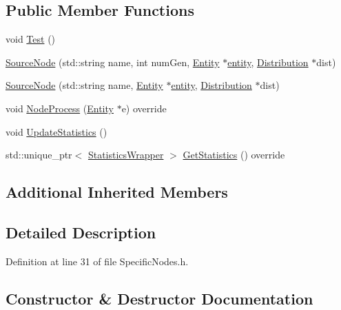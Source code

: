 \subsection*{Public Member Functions}
\begin{DoxyCompactItemize}
\item 
void \hyperlink{class_source_node_acb96be478aebf6c2badd1c5d1164e24c}{Test} ()
\item 
\hyperlink{class_source_node_aad28db9c905ffdccd8013bc1e4481848}{Source\+Node} (std\+::string name, int num\+Gen, \hyperlink{class_entity}{Entity} $\ast$\hyperlink{_entity_8h_ad79a57ed3105eb60d991a1aeb4a9dc44a428e8fcd53019fa239fa3419261e499e}{entity}, \hyperlink{class_distribution}{Distribution} $\ast$dist)
\item 
\hyperlink{class_source_node_ab287553b2a359c578f4579bd467806a2}{Source\+Node} (std\+::string name, \hyperlink{class_entity}{Entity} $\ast$\hyperlink{_entity_8h_ad79a57ed3105eb60d991a1aeb4a9dc44a428e8fcd53019fa239fa3419261e499e}{entity}, \hyperlink{class_distribution}{Distribution} $\ast$dist)
\item 
void \hyperlink{class_source_node_a666a65bd2424a8f56d8f08260c09c0b4}{Node\+Process} (\hyperlink{class_entity}{Entity} $\ast$e) override
\item 
void \hyperlink{class_source_node_a6c5037fd886362d56b7ce04094433510}{Update\+Statistics} ()
\item 
std\+::unique\+\_\+ptr$<$ \hyperlink{class_generic_node_1_1_statistics_wrapper}{Statistics\+Wrapper} $>$ \hyperlink{class_source_node_a0aea882fe808d9da6d506653be166e73}{Get\+Statistics} () override
\end{DoxyCompactItemize}
\subsection*{Additional Inherited Members}


\subsection{Detailed Description}


Definition at line 31 of file Specific\+Nodes.\+h.



\subsection{Constructor \& Destructor Documentation}
\mbox{\label{class_source_node_aad28db9c905ffdccd8013bc1e4481848}} 

